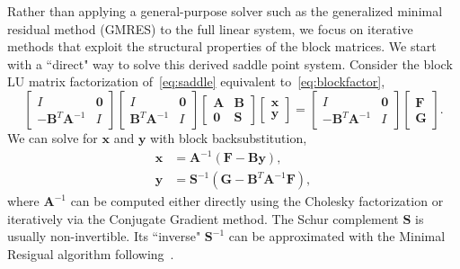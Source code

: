 Rather than applying a general-purpose solver such as the generalized minimal 
residual method (GMRES) to the full linear system,
we focus on iterative methods that exploit the structural properties of the block matrices.
We start with a ``direct" way to solve this derived saddle point system.
Consider the block LU matrix factorization of~\eqref{eq:saddle} equivalent to~\eqref{eq:blockfactor}, 
\begin{equation}
\begin{bmatrix}
					 I &\mathbf{0}\\
					 -\mathbf{B}^T\mathbf{A}^{-1} &I
		  \end{bmatrix}
\begin{bmatrix}
					 I &\mathbf{0}\\
					 \mathbf{B}^T\mathbf{A}^{-1} &I
		  \end{bmatrix}\begin{bmatrix}
					 \mathbf{A}  &\mathbf{B}\\
					 \mathbf{0} &\mathbf{S}
		  \end{bmatrix} \begin{bmatrix}
\mathbf{x}\\
\mathbf{y}
		  \end{bmatrix} = \begin{bmatrix}
					 I &\mathbf{0}\\
					 -\mathbf{B}^T\mathbf{A}^{-1} &I
		  \end{bmatrix}\begin{bmatrix}
		  \mathbf{F}\\
		  \mathbf{G}
		  \end{bmatrix}.
\end{equation}
We can solve for $\mathbf{x}$ and $\mathbf{y}$ with block backsubstitution,
\begin{equation}\label{eq:direct}
\begin{aligned}
\mathbf{x} &= \mathbf{A}^{-1} (\mathbf{F} - \mathbf{B} \mathbf{y}),\\
\mathbf{y} &= \mathbf{S}^{-1}(\mathbf{G} - \mathbf{B}^T \mathbf{A}^{-1}\mathbf{F}),
\end{aligned}
\end{equation}
where $\mathbf{A}^{-1}$ can be computed either directly using the Cholesky factorization or iteratively via 
the Conjugate Gradient method.
The Schur complement $\mathbf{S}$ is usually non-invertible.
Its ``inverse" $\mathbf{S}^{-1}$ can be approximated with the Minimal Resigual algorithm following~\cite{doi:10.1137/0712047}.

